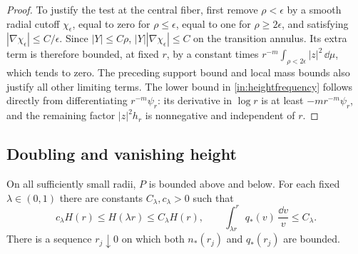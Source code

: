 \begin{proof}
To justify the test at the central fiber, first remove $\rho<\epsilon$
by a smooth radial cutoff $\chi_\epsilon$, equal to zero for
$\rho\leq\epsilon$, equal to one for $\rho\geq2\epsilon$, and satisfying
$|\nabla\chi_\epsilon|\leq C/\epsilon$.  Since $|Y|\leq C\rho$,
$|Y||\nabla\chi_\epsilon|\leq C$ on the transition annulus.  Its extra
term is therefore bounded, at fixed $r$, by a constant times
$r^{-m}\int_{\rho<2\epsilon}|z|^2\,\dd\mu$, which tends to zero.
The preceding support bound and local mass bounds also justify all
other limiting terms.  The lower bound in
\eqref{in:heightfrequency} follows directly from differentiating
$r^{-m}\psi_r$: its derivative in $\log r$ is at least
$-m r^{-m}\psi_r$, and the remaining factor $|z|^2h_r$ is
nonnegative and independent of $r$.
\end{proof}

\subsection{Doubling and vanishing height}

\begin{proposition}\label{in:bootstrap}
On all sufficiently small radii, $P$ is bounded above and below.
For each fixed $\lambda\in(0,1)$ there are constants $C_\lambda,c_\lambda>0$
such that
\begin{equation}\label{in:doubling}
 c_\lambda H(r)\leq H(\lambda r)\leq C_\lambda H(r),
 \qquad
 \int_{\lambda r}^{r}q_*(v)\,\frac{\dd v}{v}\leq C_\lambda.
\end{equation}
There is a sequence $r_j\downarrow0$ on which both $n_*(r_j)$ and
$q_*(r_j)$ are bounded.
\end{proposition}

